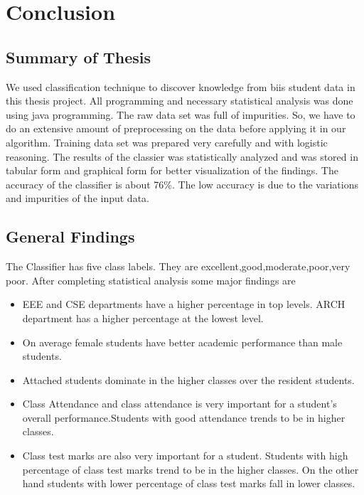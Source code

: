 
\chapter{Conclusion} %

\label{Conclusion} %




\section{Summary of Thesis}
We used classification technique to discover knowledge from biis student data in this thesis project. All programming and necessary statistical analysis was done using java programming. The raw data set was full of impurities. So, we have to do an extensive amount of preprocessing on the data before applying it in our algorithm. Training data set was prepared very carefully and with logistic reasoning. The results of the classier was statistically analyzed and was stored in tabular form and graphical form for better visualization of the findings. The accuracy of the classifier is about 76\%. The low accuracy is due to the variations and impurities of the input data.   

\section{General Findings}
The Classifier has five class labels. They are excellent,good,moderate,poor,very poor. After completing statistical analysis some major findings are
\begin{itemize}
\item EEE and CSE departments have a higher percentage in top levels. ARCH department has a higher percentage at the lowest level.

\item On average female students have better academic performance than male students.
\item Attached students dominate in the higher classes over the resident students.
\item Class Attendance and class attendance is very important for a student's overall performance.Students with good attendance trends to be in higher classes.
\item Class test marks are also very important for a student. Students with high percentage of class test marks trend to be in the higher classes. On the other hand students with lower percentage of class test marks fall in lower classes.

\end{itemize}


